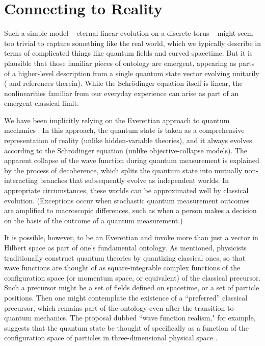 \documentclass[aps,prd,nofootinbib,notitlepage,12pt]{revtex4-2}
\begin{document}
\section{Connecting to Reality}

Such a simple model -- eternal linear evolution on a discrete torus -- might seem too trivial to capture something like the real world, which we typically describe in terms of complicated things like quantum fields and curved spacetime. 
But it is plausible that those familiar pieces of ontology are emergent, appearing as parts of a higher-level description from a single quantum state vector evolving unitarily (\cite{Carroll:2018rhc,Carroll2021} and references therein). 
While the Schr\"odinger equation itself is linear, the nonlinearities familiar from our everyday experience can arise as part of an emergent classical limit.

We have been implicitly relying on the Everettian approach to quantum mechanics \cite{wallace2012emergent}.
In this approach, the quantum state is taken as a comprehensive representation of reality (unlike hidden-variable theories), and it always evolves according to the Schr\"odinger equation (unlike objective-collapse models).
The apparent collapse of the wave function during quantum measurement is explained by the process of decoherence, which splits the quantum state into mutually non-interacting branches that subsequently evolve as independent worlds.
In appropriate circumstances, these worlds can be approximated well by classical evolution.
(Exceptions occur when stochastic quantum measurement outcomes are amplified to macroscopic differences, such as when a person makes a decision on the basis of the outcome of a quantum measurement.)

It is possible, however, to be an Everettian and invoke more than just a vector in Hilbert space as part of one's fundamental ontology. 
As mentioned, physicists traditionally construct quantum theories by quantizing classical ones, so that wave functions are thought of as square-integrable complex functions of the configuration space (or momentum space, or equivalent) of the classical precursor.
Such a precursor might be a set of fields defined on spacetime, or a set of particle positions.
Then one might contemplate the existence of a ``preferred'' classical precursor, which remains part of the ontology even after the transition to quantum mechanics.
The proposal dubbed ``wave function realism," for example, suggests that the quantum state be thought of specifically as a function of the configuration space of particles in three-dimensional physical space \cite{Albert1996-ALBEQM}.
\end{document}
